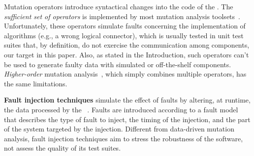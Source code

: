 Mutation operators introduce syntactical changes into the code of the . The  \emph{sufficient set of operators} is implemented by most mutation analysis toolsets~\cite{offutt1996experimental,rothermel1996experimental,andrews2005mutation,kintis2017detecting,offutt1996experimental}. 
Unfortunately, these operators simulate faults concerning the implementation of algorithms (e.g., a wrong logical connector), which is usually tested in unit test suites that, by definition, do not exercise the communication among components, our target in this paper. 
Also, as stated in the Introduction, such operators can't be used to generate faulty data with simulated or off-the-shelf components.
\emph{Higher-order} mutation analysis~\cite{harman2010manifesto}, which simply combines multiple operators, has the same limitations.






\textbf{Fault injection techniques} simulate the effect of faults by altering, at runtime, the data processed by the ~\cite{natella2016assessing}. Faults are introduced according to a fault model that describes the type of fault to inject, the timing of the injection, and the part of the system targeted by the injection. Different from data-driven mutation analysis, fault injection techniques aim to stress the robustness of the software,  
not assess the quality of its test suites.




